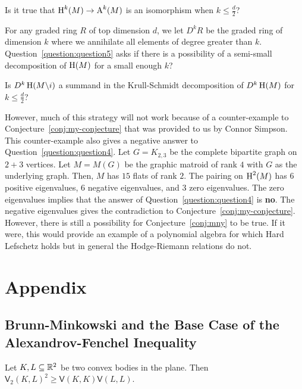 \documentclass{puthesis-UG}
\begin{document}
\begin{question} \label{question:question4}
	Is it true that $\operatorname{H}^k(M) \to \operatorname{A}^k(M)$ is an isomorphism when $k \leq \frac{d}{2}$?
\end{question}

For any graded ring $R$ of top dimension $d$, we let $D^k R$ be the graded ring of dimension $k$ where we annihilate all elements of degree greater than $k$. Question~\ref{question:question5} asks if there is a possibility of a semi-small decomposition of $\operatorname{H}(M)$ for a small enough $k$? 

\begin{question} \label{question:question5}
	Is $D^k\operatorname{H}(M \backslash i)$ a summand in the Krull-Schmidt decomposition of $D^k \operatorname{H}(M)$ for $k \leq \frac{d}{2}$? 
\end{question}

However, much of this strategy will not work because of a counter-example to Conjecture~\ref{conj:my-conjecture} that was provided to us by Connor Simpson. This counter-example also gives a negative answer to Question~\ref{question:question4}. Let $G = K_{2, 3}$ be the complete bipartite graph on $2+3$ vertices. Let $M = M(G)$ be the graphic matroid of rank $4$ with $G$ as the underlying graph. Then, $M$ has $15$ flats of rank $2$. The pairing on $\operatorname{H}^2(M)$ has $6$ positive eigenvalues, $6$ negative eigenvalues, and $3$ zero eigenvalues. The zero eigenvalues implies that the answer of Question~\ref{question:question4} is \textbf{no}. The negative eigenvalues gives the contradiction to Conjecture~\ref{conj:my-conjecture}. However, there is still a possibility for Conjecture~\ref{conj:mny} to be true. If it were, this would provide an example of a polynomial algebra for which Hard Lefschetz holds but in general the Hodge-Riemann relations do not.



\chapter{Appendix}

\section{Brunn-Minkowski and the Base Case of the Alexandrov-Fenchel Inequality}

\begin{prop} \label{base-case-for-AF-inequality}
	Let $K, L \subseteq \mathbb{R}^2$ be two convex bodies in the plane. Then $\mathsf{V}_2(K, L)^2 \geq \mathsf{V}(K, K) \mathsf{V}(L, L)$. 
\end{prop}
\end{document}
